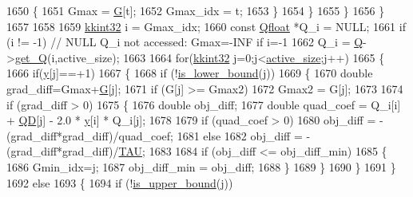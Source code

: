 \begin{DoxyCode}
1650         \{
1651           Gmax = \hyperlink{class_s_v_m289___b_f_s_1_1_solver_a23dd808efd06b7ef3a97c54b0c3c8824}{G}[t];
1652           Gmax\_idx = t;
1653         \}
1654       \}
1655     \}
1656   \}
1657 
1658 
1659   \hyperlink{namespace_k_k_b_a8fa4952cc84fda1de4bec1fbdd8d5b1b}{kkint32} i = Gmax\_idx;
1660   \textcolor{keyword}{const} \hyperlink{namespace_s_v_m289___b_f_s_a8b0a7657dcefcb6e9a857c9b5e2fd2ef}{Qfloat} *Q\_i = NULL;
1661   \textcolor{keywordflow}{if}  (i != -1) \textcolor{comment}{// NULL Q\_i not accessed: Gmax=-INF if i=-1}
1662     Q\_i = \hyperlink{class_s_v_m289___b_f_s_1_1_solver_ae0494fb6f65df63e46d76059ef07e3ec}{Q}->\hyperlink{class_s_v_m289___b_f_s_1_1_q_matrix_a5c3621d65b8135452db286640f53cbe0}{get\_Q}(i,active\_size);
1663 
1664   \textcolor{keywordflow}{for}(\hyperlink{namespace_k_k_b_a8fa4952cc84fda1de4bec1fbdd8d5b1b}{kkint32} j=0;j<\hyperlink{class_s_v_m289___b_f_s_1_1_solver_a602b406f795ec9054a09d9a1ef23a8c6}{active\_size};j++)
1665   \{
1666     \textcolor{keywordflow}{if}(\hyperlink{class_s_v_m289___b_f_s_1_1_solver_ab6e1027acd321351163e02445ac37a48}{y}[j]==+1)
1667     \{
1668       \textcolor{keywordflow}{if} (!\hyperlink{class_s_v_m289___b_f_s_1_1_solver_abb89db252806f790b5e9e19f609518ca}{is\_lower\_bound}(j))
1669       \{
1670         \textcolor{keywordtype}{double} grad\_diff=Gmax+\hyperlink{class_s_v_m289___b_f_s_1_1_solver_a23dd808efd06b7ef3a97c54b0c3c8824}{G}[j];
1671         \textcolor{keywordflow}{if} (G[j] >= Gmax2)
1672           Gmax2 = G[j];
1673 
1674         \textcolor{keywordflow}{if}  (grad\_diff > 0)
1675         \{
1676           \textcolor{keywordtype}{double} obj\_diff; 
1677           \textcolor{keywordtype}{double} quad\_coef = Q\_i[i] + \hyperlink{class_s_v_m289___b_f_s_1_1_solver_a28e141b65ab370ba3cfad591f1060b5a}{QD}[j] - 2.0 * \hyperlink{class_s_v_m289___b_f_s_1_1_solver_ab6e1027acd321351163e02445ac37a48}{y}[i] * Q\_i[j];
1678 
1679           \textcolor{keywordflow}{if}  (quad\_coef > 0)
1680             obj\_diff = -(grad\_diff*grad\_diff)/quad\_coef;
1681           \textcolor{keywordflow}{else}
1682             obj\_diff = -(grad\_diff*grad\_diff)/\hyperlink{svm289___b_f_s_8cpp_a3d8c9c145887af5174ba4cc6789862ad}{TAU};
1683 
1684           \textcolor{keywordflow}{if}  (obj\_diff <= obj\_diff\_min)
1685           \{
1686             Gmin\_idx=j;
1687             obj\_diff\_min = obj\_diff;
1688           \}
1689         \}
1690       \}
1691     \}
1692     \textcolor{keywordflow}{else}
1693     \{
1694       \textcolor{keywordflow}{if}  (!\hyperlink{class_s_v_m289___b_f_s_1_1_solver_a1bdbc9dfa56364a34b927beac631d125}{is\_upper\_bound}(j))

\end{DoxyCode}
